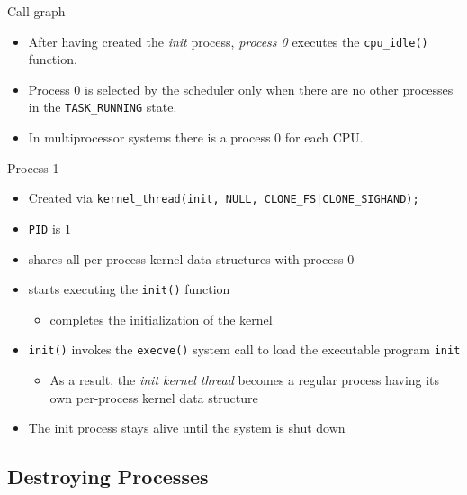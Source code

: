 \begin{frame}
  \begin{block}{Call graph}
    \begin{center}
    \end{center}
  \end{block}
  \begin{itemize}
  \item After having created the \emph{init} process, \emph{process 0} executes the
    \texttt{cpu\_idle()} function.
  \item Process 0 is selected by the scheduler only when there are no other processes in
    the \texttt{TASK\_RUNNING} state.
  \item In multiprocessor systems there is a process 0 for each CPU.
  \end{itemize}
\end{frame}

\begin{frame}{Process 1}
  \begin{itemize}
  \item Created via \mbox{{\small \texttt{kernel\_thread(init, NULL, CLONE\_FS|CLONE\_SIGHAND);}}}
  \item \texttt{PID} is 1
  \item shares all per-process kernel data structures with process 0
  \item starts executing the \texttt{init()} function
    \begin{itemize}
    \item completes the initialization of the kernel
    \end{itemize}
  \item \texttt{init()} invokes the \texttt{execve()} system call to load the executable
    program \texttt{init}
    \begin{itemize}
    \item As a result, the \emph{init kernel thread} becomes a regular process having its
      own per-process kernel data structure
    \end{itemize}
  \item The init process stays alive until the system is shut down
  \end{itemize}
\end{frame}

\subsection{Destroying Processes}

